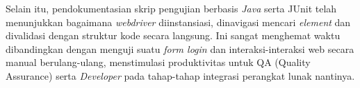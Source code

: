 \documentclass[a4paper,oneside,12pt]{report}
\renewcommand{\bibname}{Daftar Pustaka}
\begin{document}
Selain itu, pendokumentasian skrip pengujian berbasis \textit{Java} serta JUnit telah menunjukkan bagaimana \textit{webdriver} diinstansiasi, dinavigasi mencari \textit{element} dan divalidasi dengan struktur kode secara langsung. Ini sangat menghemat waktu dibandingkan dengan menguji suatu \textit{form login} dan interaksi-interaksi web secara manual berulang-ulang, menstimulasi produktivitas untuk QA (Quality Assurance) serta \textit{Developer} pada tahap-tahap integrasi perangkat lunak nantinya.


\end{document}
